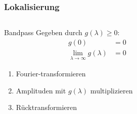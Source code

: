 %
%
%
\bgroup

\def\kurve#1#2{
        \draw[color=#2,line width=1.4pt]
                plot[domain=0:6.3,samples=400]
                        ({\x},{7*\x*exp(-(\x/#1)*(\x/#1))/#1});
}

\begin{frame}[t]
\setlength{\abovedisplayskip}{5pt}
\setlength{\belowdisplayskip}{5pt}
\frametitle{Lokalisierung}
\vspace{-20pt}
\begin{columns}[t,onlytextwidth]
\begin{column}{0.48\textwidth}
\begin{block}{Bandpass}
Gegeben durch $g(\lambda)\ge 0$:
\begin{align*}
g(0)                             &= 0\\
\lim_{\lambda\to\infty}g(\lambda)&= 0
\end{align*}
\vspace{-10pt}
\begin{enumerate}
\item<3-> Fourier-transformieren
\item<4-> Amplituden mit $g(\lambda)$ multiplizieren
\item<5-> Rücktransformieren
\end{enumerate}
\end{block}
\end{column}
\begin{column}{0.48\textwidth}
\end{column}
\end{columns}
\begin{center}
\begin{tikzpicture}[>=latex,thick,scale=0.8]


\end{tikzpicture}
\end{center}
\end{frame}
